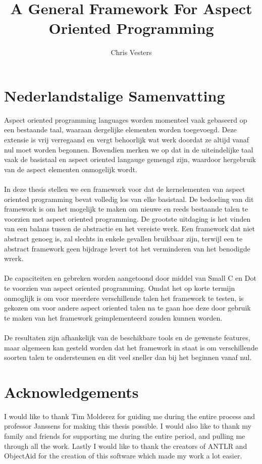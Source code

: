 \documentclass[a4paper]{report}
\title{A General Framework For Aspect Oriented Programming}
\author{Chris Vesters}
\begin{document}
\frontpages

\clearpage 
{} 
{}
\chapter*{Nederlandstalige Samenvatting}
Aspect oriented programming languages worden momenteel vaak gebaseerd op een bestaande taal, waaraan dergelijke elementen worden toegevoegd. Deze extensie is vrij verregaand en vergt behoorlijk wat werk doordat ze altijd vanaf nul moet worden begonnen. Bovendien merken we op dat in de uiteindelijke taal vaak de basistaal en aspect oriented langauge gemengd zijn, waardoor hergebruik van de aspect elementen onmogelijk wordt.\\
\\
In deze thesis stellen we een framework voor dat de kernelementen van aspect oriented programming bevat volledig los van elke basistaal. De bedoeling van dit framework is om het mogelijk te maken om nieuwe en reeds bestaande talen te voorzien met aspect oriented programming. De grootste uitdaging is het vinden van een balans tussen de abstractie en het vereiste werk. Een framework dat niet abstract genoeg is, zal slechts in enkele gevallen bruikbaar zijn, terwijl een te abstract framework geen bijdrage levert tot het verminderen van het benodigde wrerk.\\
\\
De capaciteiten en gebreken worden aangetoond door middel van Small C en Dot te voorzien van aspect oriented programming. Omdat het op korte termijn onmoglijk is om voor meerdere verschillende talen het framework te testen, is gekozen om voor andere aspect oriented talen na te gaan hoe deze door gebruik te maken van het framework geimplementeerd zouden kunnen worden.\\
\\
De resultaten zijn afhankelijk van de beschikbare tools en de gewenste features, maar algemeen kan gesteld worden dat het framework in staat is om verschillende soorten talen te ondersteunen en dit veel sneller dan bij het beginnen vanaf nul.

\clearpage 
{} 
{}
\chapter*{Acknowledgements}
I would like to thank Tim Molderez for guiding me during the entire process and professor Janssens for making this thesis possible. I would also like to thank my family and friends for supporting me during the entire period, and pulling me through all the work. Lastly I would like to thank the creators of ANTLR and ObjectAid for the creation of this software which made my work a lot easier.
\clearpage 
{} 
{}
\end{document}
